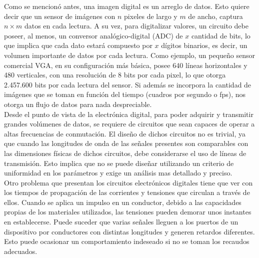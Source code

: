 Como se mencionó antes, una imagen digital es un arreglo de datos. Esto quiere decir que un sensor de imágenes con $n$ pixeles de largo y $m$ de ancho, captura $n\times m$ datos en cada lectura. A su vez, para digitalizar valores, un circuito debe poseer, al menos, un conversor analógico-digital (ADC) de $x$ cantidad de bits, lo que implica que cada dato estará compuesto por $x$ dígitos binarios, es decir, un volumen importante de datos por cada lectura. Como ejemplo, un pequeño sensor comercial VGA, en su configuración más básica, posee 640 líneas horizontales y 480 verticales, con una resolución de 8 bits por cada pixel, lo que otorga 2.457.600 bits por cada lectura del sensor.\cite{ONSemiconductor2014} Si además se incorpora la cantidad de imágenes que se toman en función del tiempo (cuadros por segundo o fps), nos otorga un flujo de datos para nada despreciable.\\

Desde el punto de vista de la electrónica digital, para poder adquirir y transmitir grandes volúmenes de datos, se requiere de circuitos que sean capaces de operar a altas frecuencias de conmutación. El diseño de dichos circuitos no es trivial, ya que cuando las longitudes de onda de las señales presentes son comparables con las dimensiones físicas de dichos circuitos, debe considerarse el uso de líneas de transmisión\cite{Ida2015}. Esto implica que no se puede diseñar utilizando un criterio de uniformidad en los parámetros y exige un análisis mas detallado y preciso.\\

Otro problema que presentan los circuitos electrónicos digitales tiene que ver con los tiempos de propagación de las corrientes y tensiones que circulan a través de ellos. Cuando se aplica un impulso en un conductor, debido a las capacidades propias de los materiales utilizados, las tensiones pueden demorar unos instantes en establecerse. Puede suceder que varias señales lleguen a los puertos de un dispositivo por conductores con distintas longitudes y generen retardos diferentes. Esto puede ocasionar un comportamiento indeseado si no se toman los recaudos adecuados.\\

